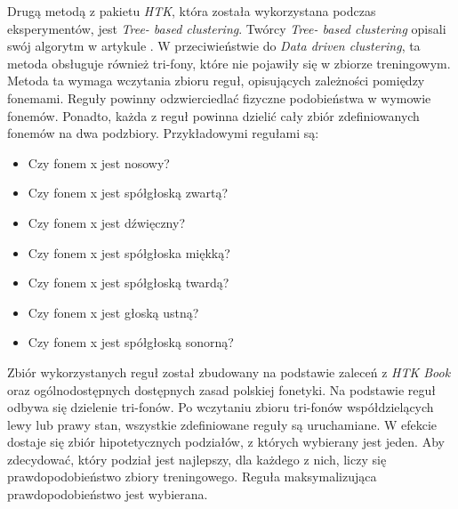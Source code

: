 \documentclass[shortabstract, mgr]{iithesis}
\begin{document}
	Drugą metodą z pakietu \textit{HTK}, która została wykorzystana podczas eksperymentów, jest \textit{Tree- based clustering}. Twórcy \textit{Tree- based clustering} opisali swój algorytm w artykule \cite{tree_based_clustring}. W przeciwieństwie do \textit{Data driven clustering}, ta metoda obsługuje również tri-fony, które nie pojawiły się w zbiorze treningowym. Metoda ta wymaga wczytania zbioru reguł, opisujących zależności pomiędzy fonemami. Reguły powinny odzwierciedlać fizyczne podobieństwa w wymowie fonemów. Ponadto, każda z reguł powinna dzielić cały zbiór zdefiniowanych fonemów na dwa podzbiory. Przykładowymi regułami są:
	\begin{itemize}
		\item Czy fonem x jest nosowy?
		\item Czy fonem x jest spółgłoską zwartą?
		\item Czy fonem x jest dźwięczny?
		\item Czy fonem x jest spółgłoska miękką?
		\item Czy fonem x jest spółgłoską twardą?
		\item Czy fonem x jest głoską ustną? 
		\item Czy fonem x jest spółgłoską sonorną? 
	\end{itemize}
	 Zbiór wykorzystanych reguł został zbudowany na podstawie zaleceń z \textit{HTK Book}\cite{htkbook} oraz ogólnodostępnych dostępnych zasad polskiej fonetyki. Na podstawie reguł odbywa się dzielenie tri-fonów. Po wczytaniu zbioru tri-fonów współdzielących lewy lub prawy stan, wszystkie zdefiniowane reguły są uruchamiane. W efekcie dostaje się zbiór hipotetycznych podziałów, z których wybierany jest jeden. Aby zdecydować, który podział jest najlepszy, dla każdego z nich, liczy się prawdopodobieństwo zbiory treningowego. Reguła maksymalizująca prawdopodobieństwo jest wybierana. \\
\end{document}
